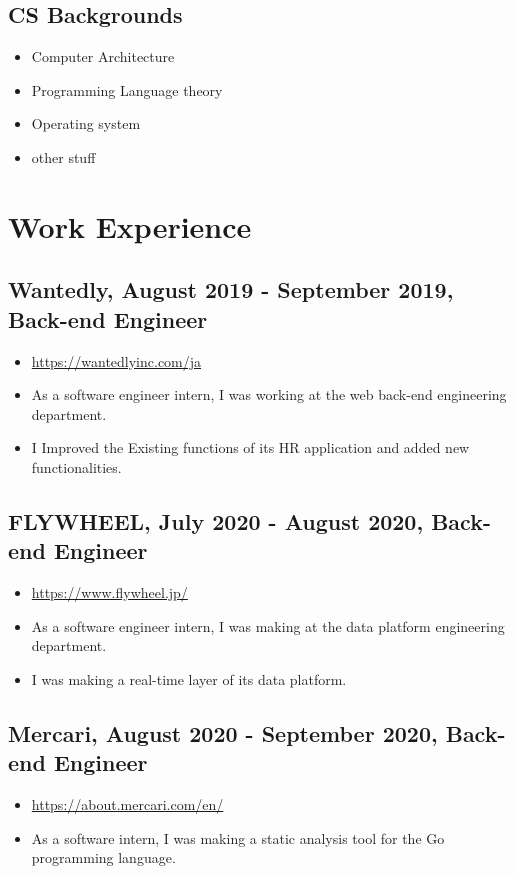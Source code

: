 \documentclass{article}
\begin{document}
    \subsection*{CS Backgrounds}
        \begin{itemize}
            \item Computer Architecture
            \item Programming Language theory
            \item Operating system
            \item other stuff
        \end{itemize}

\section*{Work Experience}
    \subsection*{Wantedly, August 2019 - September 2019, Back-end Engineer}
        \begin{itemize}
            \item \url{https://wantedlyinc.com/ja}
            \item As a software engineer intern, I was working at the web back-end engineering department.
            \item I Improved the Existing functions of its HR application and added new functionalities.
        \end{itemize}

    \subsection*{FLYWHEEL, July 2020 - August 2020, Back-end Engineer}
        \begin{itemize}
            \item \url{https://www.flywheel.jp/}
            \item As a software engineer intern, I was making at the data platform engineering department.
            \item I was making a real-time layer of its data platform.
        \end{itemize}

    \subsection*{Mercari, August 2020 - September 2020, Back-end Engineer}
        \begin{itemize}
            \item \url{https://about.mercari.com/en/}
            \item As a software intern, I was making a static analysis tool for the Go programming language.
        \end{itemize}
\end{document}

